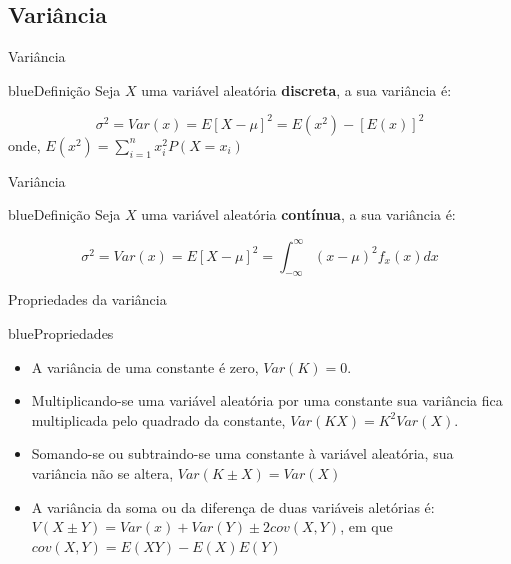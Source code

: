 \documentclass[9pt]{beamer}
\begin{document}
\subsection{Variância}
\begin{frame}{Variância}{}

\begin{block}{blue}{Definição}
Seja $X$ uma variável aleatória \textbf{discreta}, a sua variância é:

$$\sigma^2 = Var(x) = E[X-\mu]^2 = E(x^2) - [E(x)]^2$$
onde, $E(x^2) = \displaystyle{\sum_{i=1}^n}x_i^2P(X=x_i)$

\end{block}

\end{frame}

\begin{frame}{Variância}{}

\begin{block}{blue}{Definição}
Seja $X$ uma variável aleatória \textbf{contínua}, a sua variância é:

$$\sigma^2 = Var(x) = E[X- \mu]^2 =
\displaystyle{\int_{-\infty}^\infty}(x - \mu)^2f_x(x)dx$$

\end{block}

\end{frame}


\begin{frame}{Propriedades da variância}{}

\begin{block}{blue}{Propriedades}
\begin{itemize}
\item A variância de uma constante é zero, $Var(K)=0$.
\item Multiplicando-se uma variável aleatória por uma constante sua
variância fica multiplicada pelo quadrado da constante, $Var(KX) =
K^2Var(X)$.
\item Somando-se ou subtraindo-se uma constante à variável aleatória,
sua variância não se altera, $Var(K \pm X) = Var(X)$
\item A variância da soma ou da diferença de duas variáveis aletórias é:
$V(X \pm Y) =  Var(x) + Var(Y) \pm 2 cov(X,Y)$, em que $cov(X,Y) = E(XY)-E(X)E(Y)$
\end{itemize}

\end{block}

\end{frame}




{\pbebg
\begin{frame}


\end{frame}}
\end{document}
